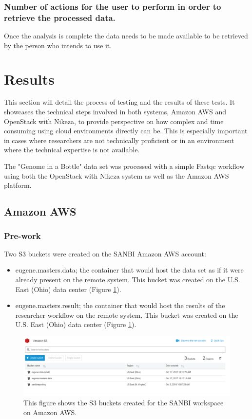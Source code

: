 \subsubsection{Number of actions for the user to perform in order to retrieve the processed data.}
Once the analysis is complete the data needs to be made available to be retrieved by the person who intends to use it.

\section{Results}
This section will detail the process of testing and the results of these tests. It showcases the technical steps involved in both systems, Amazon AWS and OpenStack with Nikeza, to provide perspective on how complex and time consuming using cloud environments directly can be. This is especially important in cases where researchers are not technically proficient or in an environment where the technical expertise is not available.

The "Genome in a Bottle" data set was processed with a simple Fastqc workflow using both the OpenStack with Nikeza system as well as the Amazon AWS platform. 

\subsection{Amazon AWS}

\subsubsection{Pre-work}

Two S3 buckets were created on the SANBI Amazon AWS account:

\begin{itemize}
    \item eugene.masters.data; the container that would host the data set as if it were already present on the remote system. This bucket was created on the U.S. East (Ohio) data center (Figure \ref{fig:s3_buckets}).
    \item eugene.masters.result; the container that would host the results of the researcher workflow on the remote system. This bucket was created on the U.S. East (Ohio) data center (Figure \ref{fig:s3_buckets}).
\end{itemize}

\begin{figure}[h!]
\centering
\includegraphics[width=\textwidth]{Figures/4_s3_buckets.png}
\decoRule
\caption[AWS S3 Buckets for Testing]{This figure shows the S3 buckets created for the SANBI workspace on Amazon AWS.}
\label{fig:s3_buckets}
\end{figure}

